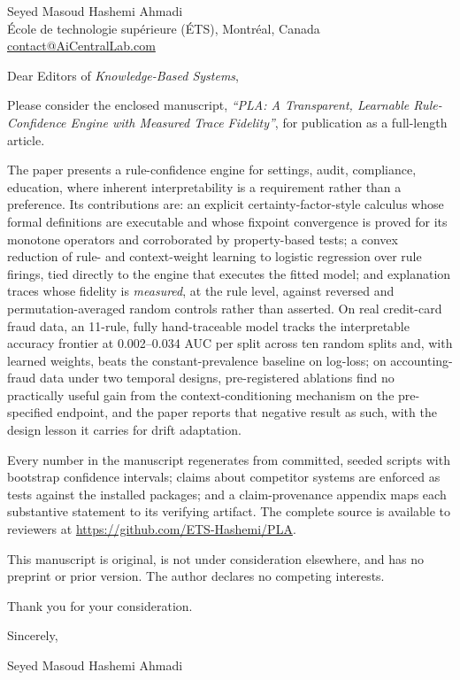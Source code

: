 \documentclass[11pt]{article}
\begin{document}
Seyed Masoud Hashemi Ahmadi\\
\'Ecole de technologie sup\'erieure (\'ETS), Montr\'eal, Canada\\
\href{mailto:contact@AiCentralLab.com}{contact@AiCentralLab.com}

\bigskip
Dear Editors of \emph{Knowledge-Based Systems},

Please consider the enclosed manuscript, \emph{``PLA: A Transparent,
Learnable Rule-Confidence Engine with Measured Trace Fidelity''}, for
publication as a full-length article.

The paper presents a rule-confidence engine for settings, audit,
compliance, education, where inherent interpretability is a
requirement rather than a preference. Its contributions are: an
explicit certainty-factor-style calculus whose formal definitions are
executable and whose fixpoint convergence is proved for its monotone
operators and corroborated by property-based tests; a convex
reduction of rule- and context-weight learning to logistic regression
over rule firings, tied directly to the engine that executes the fitted
model; and explanation traces whose fidelity is \emph{measured}, at
the rule level, against reversed and permutation-averaged random
controls rather than asserted. On real credit-card fraud data, an
11-rule, fully hand-traceable model tracks the interpretable accuracy
frontier at 0.002--0.034 AUC per split across ten random splits and,
with learned weights, beats the constant-prevalence baseline on
log-loss; on
accounting-fraud data under two temporal
designs, pre-registered ablations find no practically useful gain from
the context-conditioning mechanism on the pre-specified endpoint, and
the paper reports that negative
result as such, with the design lesson it carries for drift adaptation.

Every number in the manuscript regenerates from committed, seeded
scripts with bootstrap confidence intervals; claims about competitor
systems are enforced as tests against the installed packages; and a
claim-provenance appendix maps each substantive statement to its
verifying artifact. The complete source is available to reviewers at
\url{https://github.com/ETS-Hashemi/PLA}.

This manuscript is original, is not under consideration elsewhere, and
has no preprint or prior version. The author declares no competing
interests.

Thank you for your consideration.

\bigskip
Sincerely,

Seyed Masoud Hashemi Ahmadi
\end{document}

